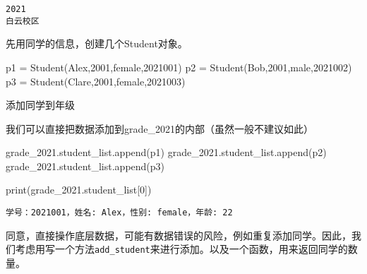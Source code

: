 \documentclass[
  letterpaper,
  DIV=11,
  numbers=noendperiod]{scrreprt}
\newenvironment{Shaded}{\begin{snugshade}}{\end{snugshade}}
\newcommand{\BuiltInTok}[1]{\textcolor[rgb]{0.00,0.23,0.31}{#1}}
\newcommand{\DecValTok}[1]{\textcolor[rgb]{0.68,0.00,0.00}{#1}}
\newcommand{\NormalTok}[1]{\textcolor[rgb]{0.00,0.23,0.31}{#1}}
\newcommand{\OperatorTok}[1]{\textcolor[rgb]{0.37,0.37,0.37}{#1}}
\newcommand{\StringTok}[1]{\textcolor[rgb]{0.13,0.47,0.30}{#1}}
\begin{document}
\begin{verbatim}
2021
白云校区
\end{verbatim}

先用同学的信息，创建几个Student对象。

\begin{Shaded}
\begin{Highlighting}[]
\NormalTok{p1 }\OperatorTok{=}\NormalTok{ Student(}\StringTok{\textquotesingle{}Alex\textquotesingle{}}\NormalTok{,}\DecValTok{2001}\NormalTok{,}\StringTok{\textquotesingle{}female\textquotesingle{}}\NormalTok{,}\DecValTok{2021001}\NormalTok{)}
\NormalTok{p2 }\OperatorTok{=}\NormalTok{ Student(}\StringTok{\textquotesingle{}Bob\textquotesingle{}}\NormalTok{,}\DecValTok{2001}\NormalTok{,}\StringTok{\textquotesingle{}male\textquotesingle{}}\NormalTok{,}\DecValTok{2021002}\NormalTok{)}
\NormalTok{p3 }\OperatorTok{=}\NormalTok{ Student(}\StringTok{\textquotesingle{}Clare\textquotesingle{}}\NormalTok{,}\DecValTok{2001}\NormalTok{,}\StringTok{\textquotesingle{}female\textquotesingle{}}\NormalTok{,}\DecValTok{2021003}\NormalTok{)}
\end{Highlighting}
\end{Shaded}

添加同学到年级

我们可以直接把数据添加到grade\_2021的内部（虽然一般不建议如此）

\begin{Shaded}
\begin{Highlighting}[]
\NormalTok{grade\_2021.student\_list.append(p1)}
\NormalTok{grade\_2021.student\_list.append(p2)}
\NormalTok{grade\_2021.student\_list.append(p3)}

\BuiltInTok{print}\NormalTok{(grade\_2021.student\_list[}\DecValTok{0}\NormalTok{])}
\end{Highlighting}
\end{Shaded}

\begin{verbatim}
学号：2021001，姓名: Alex，性别: female，年龄: 22
\end{verbatim}

同意，直接操作底层数据，可能有数据错误的风险，例如重复添加同学。因此，我们考虑用写一个方法\texttt{add\_student}来进行添加。以及一个函数，用来返回同学的数量。
\end{document}
